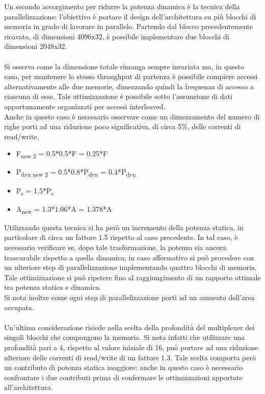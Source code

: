 \documentclass[11pt,  english, makeidx, a4paper, titlepage, oneside]{book}
\begin{document}
Un secondo accorgimento per ridurre la potenza dinamica è la tecnica della parallelizzazione: l'obiettivo è portare il design dell'architettura su più blocchi di memoria in grado di lavorare in parallelo. Partendo dal blocco precedentemente ricavato, di dimensioni 4096x32, è possibile implementare due blocchi di dimensioni 2048x32.
\\\\
Si osserva come la dimensione totale rimanga sempre invariata ma, in questo caso, per mantenere lo stesso throughput di partenza è possibile compiere accessi alternativamente alle due memorie, dimezzando quindi la frequenza di accesso a ciascuna di esse. Tale ottimizzazione è possibile sotto l'assunzione di dati opportunamente organizzati per accessi interleaved.
\\
Anche in questo caso è necessario osservare come un dimezzamento del numero di righe porti ad una riduzione poco significativa, di circa 5\%, delle correnti di read/write.
\\
\begin{itemize}
\item F\textsubscript{new 2} = 0.5*0.5*F = 0.25*F
\item P\textsubscript{dyn new 2} = 0.5*0.8*P\textsubscript{dyn} = 0.4*P\textsubscript{dyn}
\item P\textsubscript{s} = 1.5*P\textsubscript{s}
\item A\textsubscript{new} = 1.3*1.06*A = 1.378*A
\end{itemize}
\vspace{0.3cm}
Utilizzando questa tecnica si ha però un incremento della potenza statica, in particolare di circa un fattore 1.5 rispetto al caso precedente. In tal caso, è necessario verificare se, dopo tale trasformazione, la potenza sia ancora trascurabile rispetto a quella dinamica; in caso affermativo si può procedere con un ulteriore step di parallelizzazione implementando quattro blocchi di memoria. Tale ottimizzazione si può ripetere fino al raggiungimento di un rapporto ottimale tra potenza statica e dinamica.
\\
Si nota inoltre come ogni step di parallelizzazione porti ad un aumento dell'area occupata.
\\\\
Un'ultima considerazione risiede nella scelta della profondità del multiplexer dei singoli blocchi che compongono la memoria. Si nota infatti che utilizzare una profondità pari a 4, rispetto al valore iniziale di 16, può portare ad una riduzione ulteriore delle correnti di read/write di un fattore 1.3. Tale scelta comporta però un contributo di potenza statica maggiore: anche in questo caso è necessario confrontare i due contributi prima di confermare le ottimizzazioni apportate all'architettura.
\end{document}
